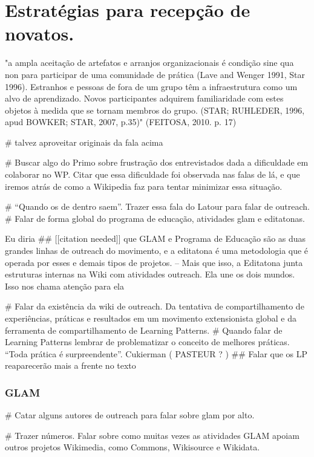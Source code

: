 \section{Estratégias para recepção de novatos.}

"a ampla aceitação de artefatos e arranjos organizacionais é condição sine qua non para participar de uma comunidade de prática (Lave and Wenger 1991, Star 1996). Estranhos e pessoas de fora de um grupo têm a infraestrutura como um alvo de aprendizado. Novos participantes adquirem familiaridade com estes objetos à medida que se tornam membros do grupo. (STAR; RUHLEDER, 1996, apud BOWKER; STAR, 2007, p.35)" (FEITOSA, 2010. p. 17)

# talvez aproveitar originais da fala acima

# Buscar algo do Primo sobre frustração dos entrevistados dada a dificuldade em colaborar no WP. Citar que essa dificuldade foi observada nas falas de lá, e que iremos atrás de como a Wikipedia faz para tentar minimizar essa situação.

# “Quando os de dentro saem”. Trazer essa fala do Latour para falar de outreach.
# Falar de forma global do programa de educação, atividades glam e editatonas.

Eu diria ## [[citation needed]] que GLAM e Programa de Educação são as duas grandes linhas de outreach do movimento, e a editatona é uma metodologia que é operada por esses e demais tipos de projetos.
-- Mais que isso, a Editatona junta estruturas internas na Wiki com atividades outreach. Ela une os dois mundos. Isso nos chama atenção para ela

# Falar da existência da wiki de outreach. Da tentativa de compartilhamento de experiências, práticas e resultados em um movimento extensionista global e da ferramenta de compartilhamento de Learning Patterns.
# Quando falar de Learning Patterns lembrar de problematizar o conceito de melhores práticas. “Toda prática é surpreendente”. Cukierman ( PASTEUR ? )
## Falar que os LP reaparecerão mais a frente no texto

\subsubsection{GLAM}

# Catar alguns autores de outreach para falar sobre glam por alto.

# Trazer números. Falar sobre como muitas vezes as atividades GLAM apoiam outros projetos Wikimedia, como Commons, Wikisource e Wikidata.

